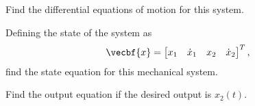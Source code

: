 \begin{prob}
    \begin{subprob}
        \item Find the differential equations of motion for this system.
        \item Defining the state of the system as
            \begin{align*}
                \vecbf{x} = \begin{bmatrix} x_1 & \dot{x}_1 & x_2 & \dot{x}_2 \end{bmatrix}^T ,
            \end{align*}
            find the state equation for this mechanical system.
        \item Find the output equation if the desired output is \( x_2(t) \).
    \end{subprob}
\end{prob}

